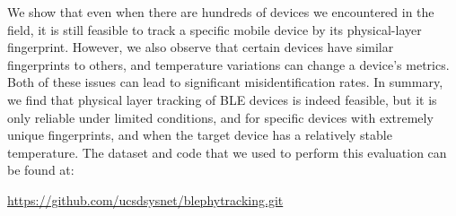 We show that even when there are hundreds of devices we encountered in the field, it is still feasible to track
a specific mobile device by its physical-layer fingerprint. However, we also
observe that certain devices have similar fingerprints to others, and temperature
variations can change a device's metrics. Both of these issues can lead to significant
misidentification rates. In summary, we find that physical layer tracking of
BLE devices is indeed feasible, but it is only
reliable under limited conditions, and for specific devices with extremely
unique fingerprints, and when the target device has a relatively stable
temperature. The dataset and code that we used to perform this evaluation
can be found at:
\begin{center}
    \url{https://github.com/ucsdsysnet/blephytracking.git}
\end{center}

